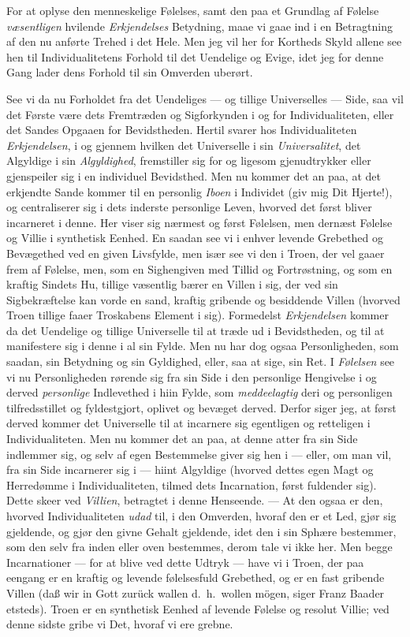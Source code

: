 \documentclass[12pt,a4paper]{book}
\newcommand{\apage}[1]{\marginnote{\footnotesize\textit{[#1]}}}
\begin{document}
For at oplyse den menneskelige Følelses, samt den paa et Grundlag af
Følelse \emph{væsentligen} hvilende \emph{Erkjendelses} Betydning, maae vi gaae ind i en
Betragtning af den nu anførte Trehed i det Hele. Men jeg vil her for
Kortheds Skyld allene see hen til Individualitetens Forhold til det
Uendelige og Evige, idet jeg for denne Gang lader dens Forhold til sin
Omverden uberørt.

See vi da nu Forholdet fra det Uendeliges --- og tillige Universelles ---
Side, saa vil det Første være dets Fremtræden og Sigforkynden i og for
Individualiteten, eller det Sandes Opgaaen for Bevidstheden. Hertil svarer
hos Individualiteten \emph{Erkjendelsen}, i og gjennem hvilken det Universelle i
sin \emph{Universalitet}, det Algyldige i sin \emph{Algyldighed}, fremstiller sig for og
ligesom gjenudtrykker eller gjenspeiler sig i en individuel Bevidsthed. Men
nu kommer det an paa, at det erkjendte Sande kommer til en personlig \emph{Iboen}
i Individet (giv mig Dit Hjerte!), og centraliserer sig i dets inderste
personlige Leven, hvorved det først bliver incarneret i denne. Her viser
sig nærmest og først Følelsen, men dernæst Følelse og Villie i synthetisk
Eenhed. En saadan see vi i enhver levende Grebethed og Bevægethed ved en
given Livsfylde, \apage{98} men især see vi den i Troen, der vel gaaer frem af
Følelse, men, som en Sighengiven med Tillid og Fortrøstning, og som en
kraftig Sindets Hu, tillige væsentlig bærer en Villen i sig, der ved sin
Sigbekræftelse kan vorde en sand, kraftig gribende og besiddende Villen
(hvorved Troen tillige faaer Troskabens Element i sig). Formedelst
\emph{Erkjendelsen} kommer da det Uendelige og tillige Universelle til at træde ud
i Bevidstheden, og til at manifestere sig i denne i al sin Fylde. Men nu
har dog ogsaa Personligheden, som saadan, sin Betydning og sin Gyldighed,
eller, saa at sige, sin Ret. I \emph{Følelsen} see vi nu Personligheden rørende
sig fra sin Side i den personlige Hengivelse i og derved \emph{personlige}
Indlevethed i hiin Fylde, som \emph{meddeelagtig} deri og personligen
tilfredsstillet og fyldestgjort, oplivet og bevæget derved. Derfor siger
jeg, at først derved kommer det Universelle til at incarnere sig
egentligen og retteligen i Individualiteten. Men nu kommer det an paa, at
denne atter fra sin Side indlemmer sig, og selv af egen Bestemmelse giver
sig hen i --- eller, om man vil, fra sin Side incarnerer sig i --- hiint
Algyldige (hvorved dettes egen Magt og Herredømme i Individualiteten,
tilmed dets Incarnation, først fuldender sig). Dette skeer ved \emph{Villien},
betragtet i denne Henseende. --- At den ogsaa er den, hvorved
Individualiteten \emph{udad} til, i den Omverden, hvoraf den er et Led, gjør sig
gjeldende, og gjør den givne Gehalt gjeldende, idet den i sin Sphære
bestemmer, som den selv fra inden eller oven bestemmes, derom tale vi ikke
her. Men begge Incarnationer --- for at blive ved dette Udtryk --- have vi
i Troen, der paa eengang er en kraftig og levende følelsesfuld Grebethed,
og er en fast gribende Villen (daß wir in Gott zurück wallen d.\ h.\ wollen
mögen, siger Franz Baader etsteds). Troen er en synthetisk Eenhed af
levende Følelse og resolut Villie; ved denne sidste gribe vi Det, hvoraf vi
ere grebne.
\end{document}

